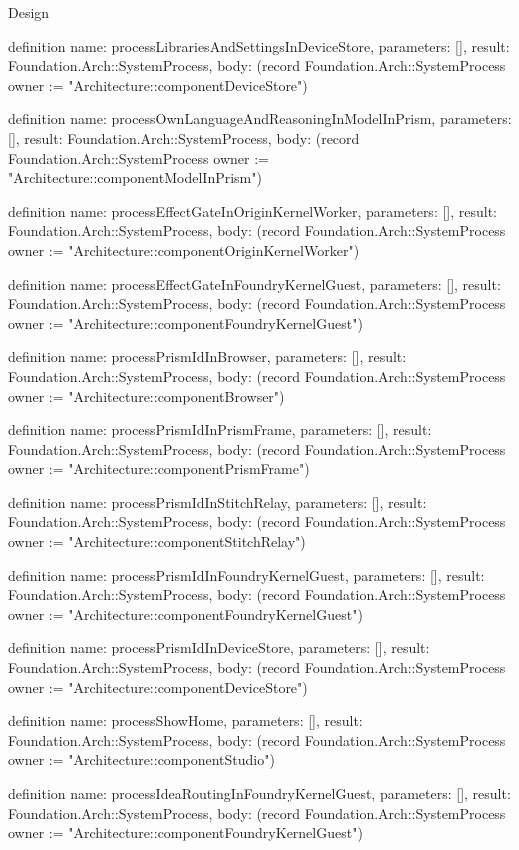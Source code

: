\begin{lexlean}{Design}
\begin{semanticmodule}
definition{
  name: processLibrariesAndSettingsInDeviceStore,
  parameters: [],
  result: Foundation.Arch::SystemProcess,
  body: (record Foundation.Arch::SystemProcess {owner := "Architecture::componentDeviceStore"})
}

definition{
  name: processOwnLanguageAndReasoningInModelInPrism,
  parameters: [],
  result: Foundation.Arch::SystemProcess,
  body: (record Foundation.Arch::SystemProcess {owner := "Architecture::componentModelInPrism"})
}

definition{
  name: processEffectGateInOriginKernelWorker,
  parameters: [],
  result: Foundation.Arch::SystemProcess,
  body: (record Foundation.Arch::SystemProcess {owner := "Architecture::componentOriginKernelWorker"})
}

definition{
  name: processEffectGateInFoundryKernelGuest,
  parameters: [],
  result: Foundation.Arch::SystemProcess,
  body: (record Foundation.Arch::SystemProcess {owner := "Architecture::componentFoundryKernelGuest"})
}

definition{
  name: processPrismIdInBrowser,
  parameters: [],
  result: Foundation.Arch::SystemProcess,
  body: (record Foundation.Arch::SystemProcess {owner := "Architecture::componentBrowser"})
}

definition{
  name: processPrismIdInPrismFrame,
  parameters: [],
  result: Foundation.Arch::SystemProcess,
  body: (record Foundation.Arch::SystemProcess {owner := "Architecture::componentPrismFrame"})
}

definition{
  name: processPrismIdInStitchRelay,
  parameters: [],
  result: Foundation.Arch::SystemProcess,
  body: (record Foundation.Arch::SystemProcess {owner := "Architecture::componentStitchRelay"})
}

definition{
  name: processPrismIdInFoundryKernelGuest,
  parameters: [],
  result: Foundation.Arch::SystemProcess,
  body: (record Foundation.Arch::SystemProcess {owner := "Architecture::componentFoundryKernelGuest"})
}

definition{
  name: processPrismIdInDeviceStore,
  parameters: [],
  result: Foundation.Arch::SystemProcess,
  body: (record Foundation.Arch::SystemProcess {owner := "Architecture::componentDeviceStore"})
}

definition{
  name: processShowHome,
  parameters: [],
  result: Foundation.Arch::SystemProcess,
  body: (record Foundation.Arch::SystemProcess {owner := "Architecture::componentStudio"})
}

definition{
  name: processIdeaRoutingInFoundryKernelGuest,
  parameters: [],
  result: Foundation.Arch::SystemProcess,
  body: (record Foundation.Arch::SystemProcess {owner := "Architecture::componentFoundryKernelGuest"})
}


\end{semanticmodule}
\end{lexlean}
